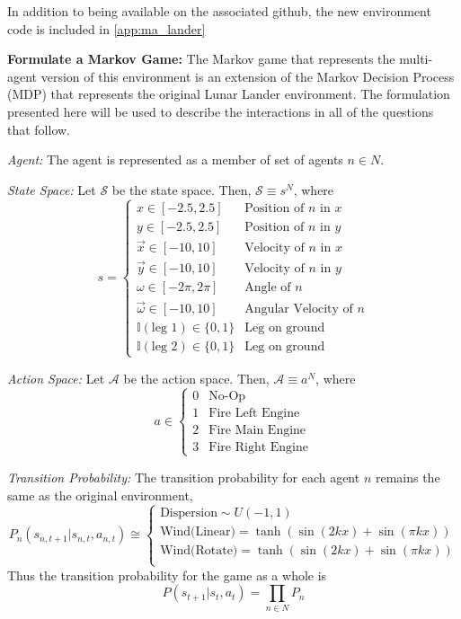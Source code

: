 \documentclass[12pt,letterpaper]{exam}
\begin{document}
In addition to being available on the associated github, the new environment
code is included in \cref{app:ma_lander}

\begin{questions}
\setcounter{question}{1}
	\question \textbf{Formulate a Markov Game:}
	The Markov game that represents the multi-agent version of this
	environment is an extension of the Markov Decision Process (MDP)
	that represents the original Lunar Lander environment.
	The formulation presented here will be used to describe the 
	interactions in all of the questions that follow.

	\emph{Agent:} The agent is represented as a member of set of agents 
	\(n\in N\).

	\emph{State Space:} Let \(\mathcal{S}\) be the state space. 
	Then, \(\mathcal{S} \equiv s^N\), where 
	\[s = \begin{cases}
		x \in [-2.5,2.5]   & \text{Position of } n \text{ in } x \\
		y \in [-2.5,2.5]   & \text{Position of } n \text{ in } y \\
		\vec{x} \in [-10,10] & \text{Velocity of } n \text{ in } x \\
		\vec{y} \in [-10,10] & \text{Velocity of } n \text{ in } y \\
		\omega \in [-2\pi,2\pi] & \text{Angle of } n\\
		\vec{\omega} \in [-10,10] & \text{Angular Velocity of } n\\
		\mathbb{I}(\text{leg 1}) \in\{0,1\}  & \text{Leg on ground}\\
		\mathbb{I}(\text{leg 2}) \in\{0,1\}  & \text{Leg on ground}
	\end{cases}\]

	\emph{Action Space:} Let \(\mathcal{A}\) be the action space.
	Then, \(\mathcal{A} \equiv a^N\), where 
	\[a \in \begin{cases}
		0 & \text{No-Op} \\
		1 & \text{Fire Left Engine} \\
		2 & \text{Fire Main Engine} \\
		3 & \text{Fire Right Engine}
	\end{cases}\]

	\emph{Transition Probability:} The transition probability for
	each agent \(n\) remains the same as the original environment,
	\[P_n(s_{n,t+1}|s_{n,t},a_{n,t}) \cong \begin{cases}
		\text{Dispersion} \sim U(-1,1) \\
		\text{Wind(Linear)} = \tanh(\sin(2 k x) + \sin(\pi k x)) \\
		\text{Wind(Rotate)} = \tanh(\sin(2 k x) + \sin(\pi k x)) \\
	\end{cases}\]
	Thus the transition probability for the game as a whole is
	\[P(s_{t+1}|s_{t},a_{t}) = \prod_{n\in N} P_n\]


\end{questions}
\end{document}
